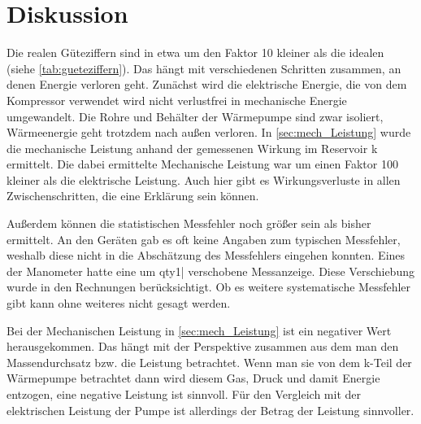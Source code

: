 \section{Diskussion}

Die realen Güteziffern sind in etwa um den Faktor 10 kleiner als die idealen (siehe \ref{tab:gueteziffern}).
Das hängt mit verschiedenen Schritten zusammen, an denen Energie verloren geht.
Zunächst wird die elektrische Energie, die von dem Kompressor verwendet wird
nicht verlustfrei in mechanische Energie umgewandelt.
Die Rohre und Behälter der Wärmepumpe sind zwar isoliert, 
Wärmeenergie geht trotzdem nach außen verloren.
In \ref{sec:mech_Leistung} wurde die mechanische Leistung anhand der gemessenen Wirkung im Reservoir k   ermittelt.
Die dabei ermittelte Mechanische Leistung war um einen Faktor 100 kleiner als die elektrische Leistung.
Auch hier gibt es Wirkungsverluste in allen Zwischenschritten, die eine Erklärung sein können.

Außerdem können die statistischen Messfehler noch größer sein als bisher ermittelt.
An den Geräten gab es oft keine Angaben zum typischen Messfehler,
weshalb diese nicht in die Abschätzung des Messfehlers eingehen konnten.
Eines der Manometer hatte eine um qty{1}{\bar} verschobene Messanzeige.
Diese Verschiebung wurde in den Rechnungen berücksichtigt.
Ob es weitere systematische Messfehler gibt kann ohne weiteres nicht gesagt werden.

Bei der Mechanischen Leistung in \ref{sec:mech_Leistung} ist ein negativer Wert herausgekommen. 
Das hängt mit der Perspektive zusammen aus dem man den Massendurchsatz bzw. die Leistung betrachtet.
Wenn man sie von dem k-Teil der Wärmepumpe betrachtet dann wird diesem Gas, Druck und damit Energie entzogen,
eine negative Leistung ist sinnvoll.
Für den Vergleich mit der elektrischen Leistung der Pumpe ist allerdings der Betrag der Leistung sinnvoller.
